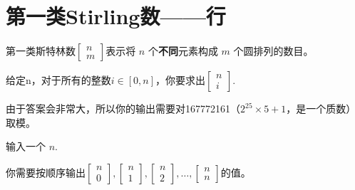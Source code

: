 \section{第一类Stirling数——行}
\par \noindent 第一类斯特林数$\begin{bmatrix}n\\ m\end{bmatrix}$表示将 $n$ 个\textbf{不同}元素构成 $m$ 个圆排列的数目。
~\\
\par \noindent 给定n，对于所有的整数$i\in[0,n]$，你要求出$\begin{bmatrix}n\\ i\end{bmatrix}$.
~\\
\par \noindent 由于答案会非常大，所以你的输出需要对167772161（$2^{25}\times 5+1$，是一个质数）取模。
~\\
\par \noindent 输入一个 $n$.
~\\
\par \noindent 你需要按顺序输出$\begin{bmatrix}n\\ 0\end{bmatrix},\begin{bmatrix}n\\ 1\end{bmatrix},\begin{bmatrix}n\\ 2\end{bmatrix},\dots,\begin{bmatrix}n\\ n\end{bmatrix}$的值。

